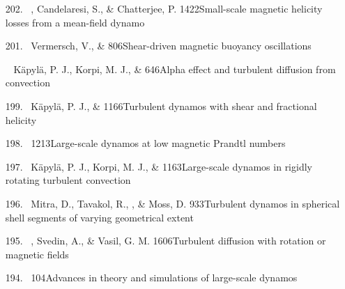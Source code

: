 \begin{itemize}
\item[{202.}~]
\Brandenburg, Candelaresi, S., \& Chatterjee, P.
{1422}{Small-scale magnetic helicity losses from a mean-field dynamo}

\item[{201.}~]
Vermersch, V., \& \Brandenburg{}
{806}{Shear-driven magnetic buoyancy oscillations}

\item[\important {200.}~]
K\"apyl\"a, P. J., Korpi, M. J., \& \Brandenburg{}
{646}{Alpha effect and turbulent diffusion from convection}

\item[{199.}~]
K\"apyl\"a, P. J., \& \Brandenburg{}
{1166}{Turbulent dynamos with shear and fractional helicity}

\item[{198.}~]
\Brandenburg{}
{1213}{Large-scale dynamos at low magnetic Prandtl numbers}

\item[{197.}~]
K\"apyl\"a, P. J., Korpi, M. J., \& \Brandenburg{}
{1163}{Large-scale dynamos in rigidly rotating turbulent convection}

\item[{196.}~]
Mitra, D., Tavakol, R., \Brandenburg, \& Moss, D.
{933}{Turbulent dynamos in spherical shell segments of varying geometrical extent}

\item[{195.}~]
\Brandenburg, Svedin, A., \& Vasil, G. M.
{1606}{Turbulent diffusion with rotation or magnetic fields}

\item[{194.}~]
\Brandenburg{}
{104}{Advances in theory and simulations of large-scale dynamos}


\end{itemize}
